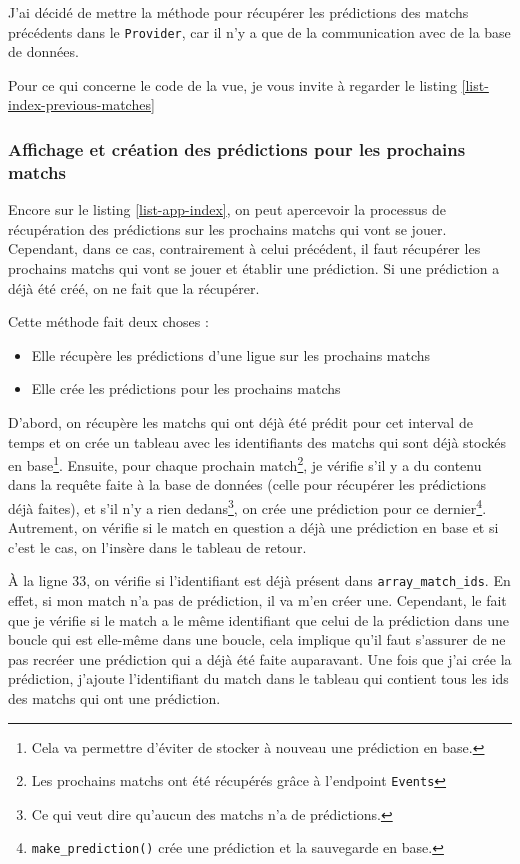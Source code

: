 \documentclass[a4paper,14pt]{extarticle}
\begin{document}
{J'ai décidé de mettre la méthode pour récupérer les prédictions des matchs précédents dans le \texttt{Provider}, car il n'y a que de la communication avec de la base de données.

Pour ce qui concerne le code de la vue, je vous invite à regarder le listing \ref{list-index-previous-matches}


\subsubsection{Affichage et création des prédictions pour les prochains matchs}

Encore sur le listing \ref{list-app-index}, on peut apercevoir la processus de récupération des prédictions sur les prochains matchs qui vont se jouer. Cependant, dans ce cas, contrairement à celui précédent, il faut récupérer les prochains matchs qui vont se jouer et établir une prédiction. Si une prédiction a déjà été créé, on ne fait que la récupérer.


Cette méthode fait deux choses :
\begin{itemize}
    \item Elle récupère les prédictions d'une ligue sur les prochains matchs
    \item Elle crée les prédictions pour les prochains matchs
\end{itemize}

D'abord, on récupère les matchs qui ont déjà été prédit pour cet interval de temps et on crée un tableau avec les identifiants des matchs qui sont déjà stockés en base\footnote{Cela va permettre d'éviter de stocker à nouveau une prédiction en base.}. Ensuite, pour chaque prochain match\footnote{Les prochains matchs ont été récupérés grâce à l'endpoint \texttt{Events}}, je vérifie s'il y a du contenu dans la requête faite à la base de données (celle pour récupérer les prédictions déjà faites), et s'il n'y a rien dedans\footnote{Ce qui veut dire qu'aucun des matchs n'a de prédictions.}, on crée une prédiction pour ce dernier\footnote{\texttt{make\_prediction()} crée une prédiction et la sauvegarde en base.}. Autrement, on vérifie si le match en question a déjà une prédiction en base et si c'est le cas, on l'insère dans le tableau de retour.

À la ligne 33, on vérifie si l'identifiant est déjà présent dans \texttt{array\_match\_ids}. En effet, si mon match n'a pas de prédiction, il va m'en créer une. Cependant, le fait que je vérifie si le match a le même identifiant que celui de la prédiction dans une boucle qui est elle-même dans une boucle, cela implique qu'il faut s'assurer de ne pas recréer une prédiction qui a déjà été faite auparavant. Une fois que j'ai crée la prédiction, j'ajoute l'identifiant du match dans le tableau qui contient tous les ids des matchs qui ont une prédiction.

}
\end{document}
